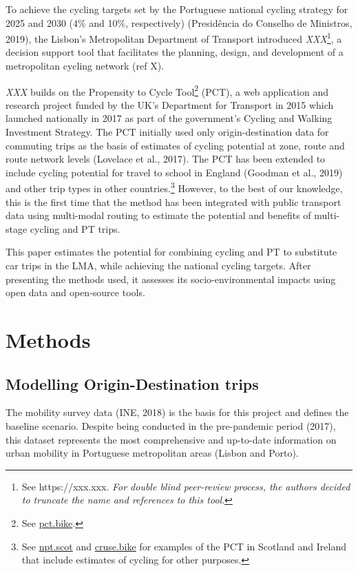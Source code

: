 \documentclass[review, doubleblind, 3p,
authoryear]{elsarticle} %
\begin{document}
To achieve the cycling targets set by the Portuguese national cycling
strategy for 2025 and 2030 (4\% and 10\%, respectively) (Presidência do
Conselho de Ministros, 2019), the Lisbon's Metropolitan Department of
Transport introduced \emph{XXX}\footnote{See https://xxx.xxx. \emph{For
  double blind peer-review process, the authors decided to truncate the
  name and references to this tool}.}, a decision support tool that
facilitates the planning, design, and development of a metropolitan
cycling network (ref X).

\emph{XXX} builds on the Propensity to Cycle Tool\footnote{See
  \href{https://www.pct.bike/}{pct.bike}.} (PCT), a web application and
research project funded by the UK's Department for Transport in 2015
which launched nationally in 2017 as part of the government's Cycling
and Walking Investment Strategy. The PCT initially used only
origin-destination data for commuting trips as the basis of estimates of
cycling potential at zone, route and route network levels (Lovelace et
al., 2017). The PCT has been extended to include cycling potential for
travel to school in England (Goodman et al., 2019) and other trip types
in other countries.\footnote{See \href{https://www.npt.scot}{npt.scot}
  and \href{https://cruse.bike}{cruse.bike} for examples of the PCT in
  Scotland and Ireland that include estimates of cycling for other
  purposes.} However, to the best of our knowledge, this is the first
time that the method has been integrated with public transport data
using multi-modal routing to estimate the potential and benefits of
multi-stage cycling and PT trips.

This paper estimates the potential for combining cycling and PT to
substitute car trips in the LMA, while achieving the national cycling
targets. After presenting the methods used, it assesses its
socio-environmental impacts using open data and open-source tools.

\hypertarget{methods}{%
\section{Methods}\label{methods}}

\hypertarget{modelling-origin-destination-trips}{%
\subsection{Modelling Origin-Destination
trips}\label{modelling-origin-destination-trips}}

The mobility survey data (INE, 2018) is the basis for this project and
defines the baseline scenario. Despite being conducted in the
pre-pandemic period (2017), this dataset represents the most
comprehensive and up-to-date information on urban mobility in Portuguese
metropolitan areas (Lisbon and Porto).
\end{document}
